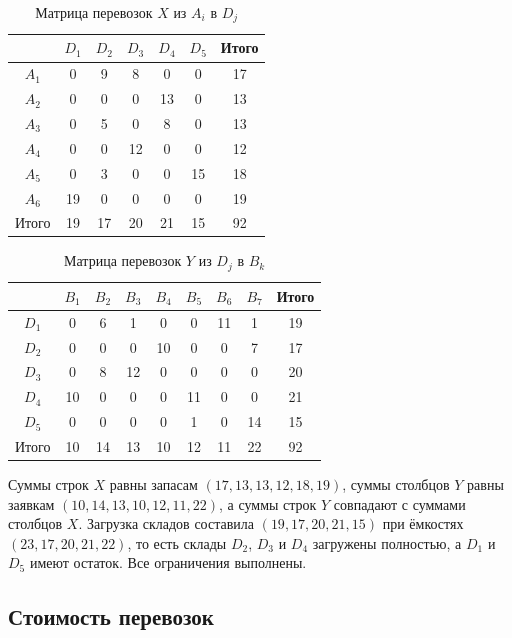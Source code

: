 \begin{table}[h!]
\centering
\caption{Матрица перевозок $X$ из $A_i$ в $D_j$}
\label{tab:X}
\begin{tabular}{|c|c|c|c|c|c|c|}
\hline
 & $D_1$ & $D_2$ & $D_3$ & $D_4$ & $D_5$ & Итого \\
\hline
$A_1$ & 0 & 9 & 8 & 0 & 0 & 17 \\
\hline
$A_2$ & 0 & 0 & 0 & 13 & 0 & 13 \\
\hline
$A_3$ & 0 & 5 & 0 & 8 & 0 & 13 \\
\hline
$A_4$ & 0 & 0 & 12 & 0 & 0 & 12 \\
\hline
$A_5$ & 0 & 3 & 0 & 0 & 15 & 18 \\
\hline
$A_6$ & 19 & 0 & 0 & 0 & 0 & 19 \\
\hline
Итого & 19 & 17 & 20 & 21 & 15 & 92 \\
\hline
\end{tabular}
\end{table}

\begin{table}[h!]
\centering
\caption{Матрица перевозок $Y$ из $D_j$ в $B_k$}
\label{tab:Y}
\small
\begin{tabular}{|c|c|c|c|c|c|c|c|c|}
\hline
 & $B_1$ & $B_2$ & $B_3$ & $B_4$ & $B_5$ & $B_6$ & $B_7$ & Итого \\
\hline
$D_1$ & 0 & 6 & 1 & 0 & 0 & 11 & 1 & 19 \\
\hline
$D_2$ & 0 & 0 & 0 & 10 & 0 & 0 & 7 & 17 \\
\hline
$D_3$ & 0 & 8 & 12 & 0 & 0 & 0 & 0 & 20 \\
\hline
$D_4$ & 10 & 0 & 0 & 0 & 11 & 0 & 0 & 21 \\
\hline
$D_5$ & 0 & 0 & 0 & 0 & 1 & 0 & 14 & 15 \\
\hline
Итого & 10 & 14 & 13 & 10 & 12 & 11 & 22 & 92 \\
\hline
\end{tabular}
\end{table}

Суммы строк $X$ равны запасам $(17,13,13,12,18,19)$, суммы столбцов $Y$
равны заявкам $(10,14,13,10,12,11,22)$, а суммы строк $Y$ совпадают с
суммами столбцов $X$. Загрузка складов составила
$(19,17,20,21,15)$ при ёмкостях $(23,17,20,21,22)$, то есть склады
$D_2$, $D_3$ и $D_4$ загружены полностью, а $D_1$ и $D_5$ имеют остаток.
Все ограничения выполнены.

\subsection*{Стоимость перевозок}


